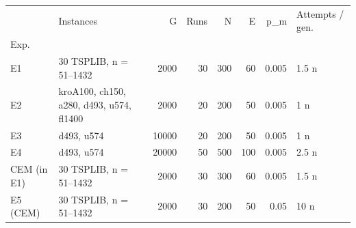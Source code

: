 \begin{tabular}{llrrrrrl}
\toprule
 & Instances & G & Runs & N & E & p\_m & Attempts / gen. \\
Exp. &  &  &  &  &  &  &  \\
\midrule
E1 & 30 TSPLIB, n = 51–1432 & 2000 & 30 & 300 & 60 & 0.005 & 1.5 n \\
E2 & kroA100, ch150, a280, d493, u574, fl1400 & 2000 & 20 & 200 & 50 & 0.005 & 1 n \\
E3 & d493, u574 & 10000 & 20 & 200 & 50 & 0.005 & 1 n \\
E4 & d493, u574 & 20000 & 50 & 500 & 100 & 0.005 & 2.5 n \\
CEM (in E1) & 30 TSPLIB, n = 51–1432 & 2000 & 30 & 300 & 60 & 0.005 & 1.5 n \\
E5 (CEM) & 30 TSPLIB, n = 51–1432 & 2000 & 30 & 200 & 50 & 0.05 & 10 n \\
\bottomrule
\end{tabular}
